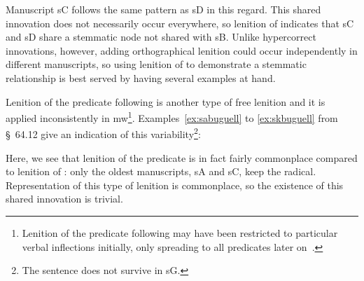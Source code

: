 Manuscript \gls{sC} follows the same pattern as \gls{sD} in this regard. This shared innovation does not necessarily occur everywhere, so lenition of  indicates that  \gls{sC} and \gls{sD} share a stemmatic node not shared with \gls{sB}. Unlike hypercorrect innovations, however, adding orthographical lenition could occur independently in different manuscripts, so using lenition of  to demonstrate a stemmatic relationship is best served by having several examples at hand.


Lenition of the predicate following  is another type of free lenition and it is applied inconsistently in \gls{mw}\footnote{Lenition of the predicate following  may have been restricted to particular verbal inflections initially, only spreading to all predicates later on~\autocite[77]{van_development14}.}. Examples~\ref{ex:sabuguell} to \ref{ex:skbuguell} from  §~64.12 give an indication of this variability\footnote{The sentence does not survive in \gls{sG}.}:
\begin{mwl}
\end{mwl}
Here, we see that lenition of the predicate is in fact fairly commonplace compared to  lenition of : only the oldest manuscripts, \gls{sA} and \gls{sC}, keep the radical. Representation of this type of lenition is commonplace, so the existence of this shared innovation is trivial.

